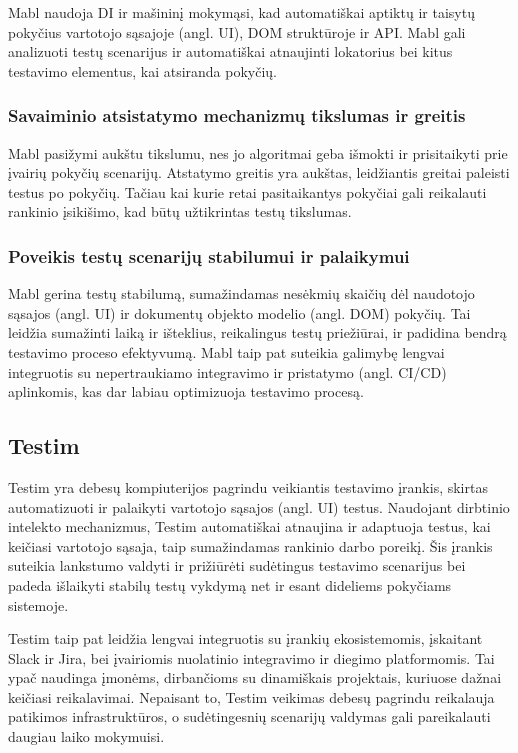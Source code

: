 \documentclass[
]{VUMIFPSkursinis}
\begin{document}
Mabl naudoja DI ir mašininį mokymąsi, kad automatiškai aptiktų ir taisytų pokyčius vartotojo sąsajoje (angl. UI), DOM struktūroje ir API. Mabl gali analizuoti testų scenarijus ir automatiškai atnaujinti lokatorius bei kitus testavimo elementus, kai atsiranda pokyčių.

\subsubsection{Savaiminio atsistatymo mechanizmų tikslumas ir greitis}

Mabl pasižymi aukštu tikslumu, nes jo algoritmai geba išmokti ir prisitaikyti prie įvairių pokyčių scenarijų. Atstatymo greitis yra aukštas, leidžiantis greitai paleisti testus po pokyčių. Tačiau kai kurie retai pasitaikantys pokyčiai gali reikalauti rankinio įsikišimo, kad būtų užtikrintas testų tikslumas.

\subsubsection{Poveikis testų scenarijų stabilumui ir palaikymui}

Mabl gerina testų stabilumą, sumažindamas nesėkmių skaičių dėl naudotojo sąsajos (angl. UI) ir dokumentų objekto modelio (angl. DOM) pokyčių. Tai leidžia sumažinti laiką ir išteklius, reikalingus testų priežiūrai, ir padidina bendrą testavimo proceso efektyvumą. Mabl taip pat suteikia galimybę lengvai integruotis su nepertraukiamo integravimo ir pristatymo (angl. CI/CD) aplinkomis, kas dar labiau optimizuoja testavimo procesą.

\subsection{Testim}
Testim yra debesų kompiuterijos pagrindu veikiantis testavimo įrankis, skirtas automatizuoti ir palaikyti vartotojo sąsajos (angl. UI) testus. Naudojant dirbtinio intelekto mechanizmus, Testim automatiškai atnaujina ir adaptuoja testus, kai keičiasi vartotojo sąsaja, taip sumažindamas rankinio darbo poreikį. Šis įrankis suteikia lankstumo valdyti ir prižiūrėti sudėtingus testavimo scenarijus bei padeda išlaikyti stabilų testų vykdymą net ir esant dideliems pokyčiams sistemoje.

Testim taip pat leidžia lengvai integruotis su įrankių ekosistemomis, įskaitant Slack ir Jira, bei įvairiomis nuolatinio integravimo ir diegimo platformomis. Tai ypač naudinga įmonėms, dirbančioms su dinamiškais projektais, kuriuose dažnai keičiasi reikalavimai. Nepaisant to, Testim veikimas debesų pagrindu reikalauja patikimos infrastruktūros, o sudėtingesnių scenarijų valdymas gali pareikalauti daugiau laiko mokymuisi. \cite{Testim}
\end{document}
